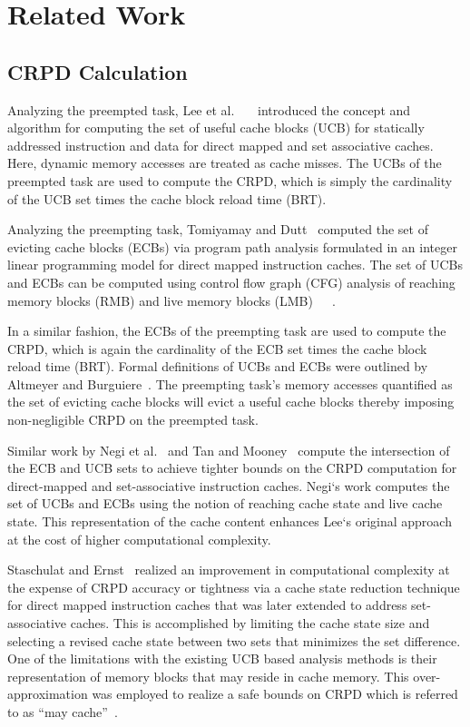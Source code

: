 \section{Related Work}\label{sec:related}

\subsection {CRPD Calculation}\label{sec:crpd_related_work}
Analyzing the preempted task, Lee et al.~\cite{lee:96}~\cite{lee:97}~\cite{lee:98} introduced the concept and algorithm for computing the set of useful cache blocks (UCB) for statically addressed instruction and data for direct mapped and set associative caches.  Here, dynamic memory accesses are treated as cache misses.  The UCBs of the preempted task are used to compute the CRPD, which is simply the cardinality of the UCB set times the cache block reload time (BRT).

Analyzing the preempting task, Tomiyamay and Dutt~\cite{tomiyamay:00} computed the set of evicting cache blocks (ECBs) via program path analysis formulated in an integer linear programming model for direct mapped instruction caches.  The set of UCBs and ECBs can be computed using control flow graph (CFG) analysis of reaching memory blocks (RMB) and live memory blocks (LMB)~\cite{lee:96}~\cite{lee:97}~\cite{lee:98}.

In a similar fashion, the ECBs of the preempting task are used to compute the CRPD, which is again the cardinality of the ECB set times the cache block reload time (BRT). Formal definitions of UCBs and ECBs were outlined by Altmeyer and Burguiere~\cite{altmeyer:11c}.  The preempting task’s memory accesses quantified as the set of evicting cache blocks will evict a useful cache blocks thereby imposing non-negligible CRPD on the preempted task.

Similar work by Negi et al.~\cite{negi:03} and Tan and Mooney~\cite{tan:04} compute the intersection of the ECB and UCB sets to achieve tighter bounds on the CRPD computation for direct-mapped and set-associative instruction caches. Negi`s work computes the set of UCBs and ECBs using the notion of reaching cache state and live cache state. This representation of the cache content enhances Lee`s original approach at the cost of higher computational complexity.

Staschulat and Ernst~\cite{staschulat:05c} realized an improvement in computational complexity at the expense of CRPD accuracy or tightness via a cache state reduction technique for direct mapped instruction caches that was later extended to address set-associative caches. This is accomplished by limiting the cache state size and selecting a revised cache state between two sets that minimizes the set difference.  One of the limitations with the existing UCB based analysis methods is their representation of memory blocks that may reside in cache memory.  This over-approximation was employed to realize a safe bounds on CRPD which is referred to as “may cache”~\cite{altmeyer:11c}.

